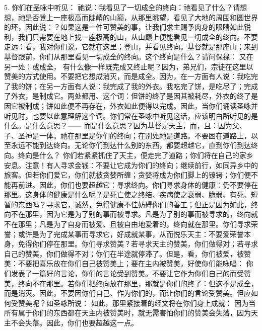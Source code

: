 5. 你们在圣咏中听见： 祂说：我看见了一切成全的终向：祂看见了什么？请想想，祂是否登上一座极高而陡峭的山巅，从那里眺望，看见了大地的周围和圆世界的环，因此说：？如果这是一件可赞美的事，让我们求主赐予肉身的眼睛如此锐利，我们只需要在地上找一座极高的山，从山巅上便能看见一切成全的终向。不要走远：看，我对你们说，它就在这里；登山，并看见终向。基督就是那座山；来到基督跟前，你们从那里看见一切成全的终向。这个终向是什么？请问保禄：  又在另一处：或成全， 有什么像一样既完成又终止呢？因为，弟兄们，宗徒在这里以赞美的方式使用。不要把它想成消灭，而是成全。因为，在一方面有人说：我吃完了我的饼；在另一方面有人说：我完成了我的外衣。我吃完了饼，是吃尽了；完成了外衣，是制成它。两处都用、这个词：但饼的终了是因其被耗尽，外衣的终了是因它被制成；饼如此便不再存在，外衣如此便得以完成。因此，当你们诵读圣咏并听见时，也要以此意理解这个词。你们常在圣咏中听见这话，应该明白所听见的是什么。是什么意思？——  而是什么意思？因为基督是天主，而，且：因为父、子、圣神是一体。祂在那里是你们的终向；在别处祂是道路。不要困在道路上，以至永远不能到达终向。无论你们到达什么别的东西，都要超越它，直到你们到达终向。终向是什么？ 你们若紧紧抓住了天主，便走完了道路；你们将在自己的家乡安息。注意！有人寻求金钱：不要让它成为你们的终向；继续前行，如同异乡中的旅客。但若你们爱它，你们就被贪婪所缠；贪婪将成为你们脚上的镣铐；你们便不能再前进。因此，你们也要超越它：寻求终向。你们寻求身体的健康：仍不要停在那里。这身体的健康是什么呢？是死亡使之终结、疾病使之衰弱、脆弱、有死、短暂的东西吗？寻求它，诚然，免得健康不佳妨碍你们的善工；但正是因为如此，终向不在那里，因为它是为了别的事而被寻求。凡是为了别的事而被寻求的，终向就不在那里；凡是为了自身而被爱、且被自由地爱着的，终向就在那里。你们寻求荣誉；或许是为了完成某事而寻求它，好成就某事，从而悦乐天主：不要爱荣誉本身，免得你们停在那里。你们寻求赞美？若寻求天主的赞美，你们做得对；若寻求自己的赞美，你们做得不对；你们在半途就停滞了。但是，看，你们被爱，被赞美：不要把喜乐放在你们自己被赞美上；要在主内被赞美，好使你们能咏唱： 你们发表了一篇好的言论，你们的言论受到赞美。不要让它作为你们自己的而受赞美，终向不在那里。若你们把终向放在那里，那就是你们的终了：但这不是成全，而是消灭。因此，不要因你们自己、作为你们的，而让你们的言论受赞美。但应如何受赞美呢？如圣咏所说： 如此，那里紧接着的经文将在你们身上成就： 因为当所有属于你们的东西都在天主内被赞美时，就无需害怕你们的赞美会失落，因为天主不会失落。因此，你们也要超越这一点。\par

